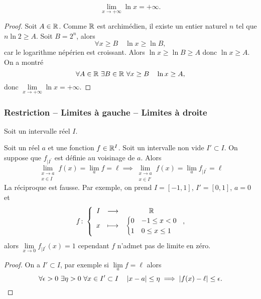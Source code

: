 \begin{theo}
  \begin{equation}
    \lim\limits_{x \to +\infty} \ln x = + \infty.
  \end{equation}
\end{theo}
\begin{proof}
  Soit $A \in \mathbb{R}$. Comme $\mathbb{R}$ est archimédien, il existe un entier naturel $n$ tel que $n \ln 2 \geq A$. Soit $B=2^n$, alors
  \begin{equation}
    \forall x \geq B \quad \ln x \geq \ln B,
  \end{equation}
  car le logarithme népérien est croissant. Alors $\ln x \geq \ln B \geq A$ donc $\ln x \geq A$. On a montré
\begin{equation}
  \forall A \in \mathbb{R} \ \exists B \in \mathbb{R} \ \forall x \geq B \quad \ln x \geq A,
\end{equation}
donc $\lim\limits_{x \to +\infty} \ln x = + \infty$.
\end{proof}

\subsubsection{Restriction -- Limites à gauche -- Limites à droite}
Soit un intervalle réel $I$.
\begin{prop}
  Soit un réel $a$ et une fonction $f \in \mathbb{R}^I$. Soit un intervalle non vide $I' \subset I$. On suppose que $f_{|I^{'}}$ est définie au voisinage de $a$. Alors
  \begin{equation}
    \lim\limits_{\begin{array}{l} x \to a \\ x \in I\end{array}}f(x)=\lim\limits_{a}f=\ell \implies \lim\limits_{\begin{array}{l} x \to a \\ x \in I'\end{array}}f(x)=\lim\limits_{a}f_{|I^{'}}=\ell
  \end{equation}
La réciproque est fausse. Par exemple, on prend $I=[-1,1]$, $I'=[0,1]$, $a=0$ et
\begin{equation}
  f\colon \left\{\begin{array}{ccc} I & \longrightarrow &\mathbb{R}\\ x & \longmapsto & \begin{cases} 0 & -1 \leq x < 0 \\ 1 & 0 \leq x \leq 1\end{cases} \end{array} \right.,
\end{equation}
alors $\lim\limits_{x \to 0}f_{|I^{'}}(x)=1$ cependant $f$ n'admet pas de limite en zéro.
\end{prop}
\begin{proof}
  On a $ I' \subset I$, par exemple si $\lim\limits_{a} f =\ell$ alors
  \begin{equation}
    \forall \epsilon > 0 \ \exists \eta > 0 \ \forall x \in I' \subset I \quad \left\lvert x-a\right\rvert \leq \eta \implies \left\lvert f(x) - \ell\right\rvert \leq \epsilon.
  \end{equation}
\end{proof}


